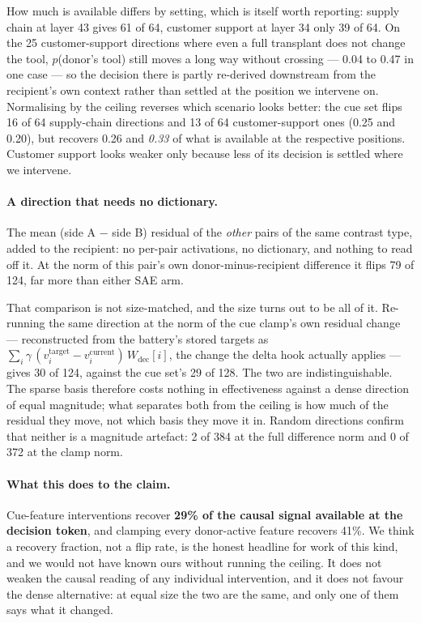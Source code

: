 \documentclass{article}
\begin{document}
How much is available differs by setting, which is itself worth reporting: supply chain at layer 43 gives 61 of 64, customer support at layer 34 only 39 of 64. On the 25 customer-support directions where even a full transplant does not change the tool, $p$(donor's tool) still moves a long way without crossing --- 0.04 to 0.47 in one case --- so the decision there is partly re-derived downstream from the recipient's own context rather than settled at the position we intervene on. Normalising by the ceiling reverses which scenario looks better: the cue set flips 16 of 64 supply-chain directions and 13 of 64 customer-support ones (0.25 and 0.20), but recovers 0.26 and \emph{0.33} of what is available at the respective positions. Customer support looks weaker only because less of its decision is settled where we intervene.

\paragraph{A direction that needs no dictionary.} The mean (side A $-$ side B) residual of the \emph{other} pairs of the same contrast type, added to the recipient: no per-pair activations, no dictionary, and nothing to read off it. At the norm of this pair's own donor-minus-recipient difference it flips 79 of 124, far more than either SAE arm.

That comparison is not size-matched, and the size turns out to be all of it. Re-running the same direction at the norm of the cue clamp's own residual change --- reconstructed from the battery's stored targets as $\sum_i \gamma\,(v^{\text{target}}_i - v^{\text{current}}_i)\,W_{\text{dec}}[i]$, the change the delta hook actually applies --- gives 30 of 124, against the cue set's 29 of 128. The two are indistinguishable. The sparse basis therefore costs nothing in effectiveness against a dense direction of equal magnitude; what separates both from the ceiling is how much of the residual they move, not which basis they move it in. Random directions confirm that neither is a magnitude artefact: 2 of 384 at the full difference norm and 0 of 372 at the clamp norm.

\paragraph{What this does to the claim.} Cue-feature interventions recover \textbf{29\% of the causal signal available at the decision token}, and clamping every donor-active feature recovers 41\%. We think a recovery fraction, not a flip rate, is the honest headline for work of this kind, and we would not have known ours without running the ceiling. It does not weaken the causal reading of any individual intervention, and it does not favour the dense alternative: at equal size the two are the same, and only one of them says what it changed.
\end{document}
